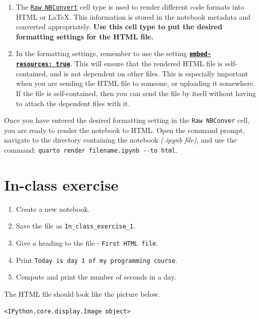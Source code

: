 \documentclass[
  letterpaper,
  DIV=11,
  numbers=noendperiod]{scrreprt}
\providecommand{\tightlist}{%
  \setlength{\itemsep}{0pt}\setlength{\parskip}{0pt}}\usepackage{longtable,booktabs,array}
\begin{document}
\begin{enumerate}
\def\labelenumi{\arabic{enumi}.}
\item
  The
  \href{https://nbsphinx.readthedocs.io/en/0.9.3/raw-cells.html}{\texttt{Raw\ NBConvert}}
  cell type is used to render different code formats into HTML or LaTeX.
  This information is stored in the notebook metadata and converted
  appropriately. \textbf{Use this cell type to put the desired
  formatting settings for the HTML file.}
\item
  In the formatting settings, remember to use the setting
  \textbf{\href{https://quarto.org/docs/output-formats/html-basics.html\#self-contained}{\texttt{embed-resources:\ true}}}.
  This will ensure that the rendered HTML file is self-contained, and is
  not dependent on other files. This is especially important when you
  are sending the HTML file to someone, or uploading it somewhere. If
  the file is self-contained, then you can send the file by itself
  without having to attach the dependent files with it.
\end{enumerate}

Once you have entered the desired formatting setting in the
\texttt{Raw\ NBConver} cell, you are ready to render the notebook to
HTML. Open the command prompt, navigate to the directory containing the
notebook \emph{(.ipynb file)}, and use the command:
\texttt{quarto\ render\ filename.ipynb\ -\/-to\ html}.

\hypertarget{in-class-exercise}{%
\section{In-class exercise}\label{in-class-exercise}}

\begin{enumerate}
\def\labelenumi{\arabic{enumi}.}
\tightlist
\item
  Create a new notebook.
\item
  Save the file as \texttt{In\_class\_exercise\_1}.
\item
  Give a heading to the file - \texttt{First\ HTML\ file}.
\item
  Print \texttt{Today\ is\ day\ 1\ of\ my\ programming\ course}.
\item
  Compute and print the number of seconds in a day.
\end{enumerate}

The HTML file should look like the picture below.

\begin{verbatim}
<IPython.core.display.Image object>
\end{verbatim}
\end{document}
